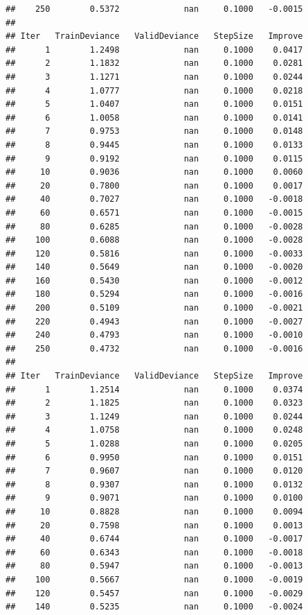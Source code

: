 \documentclass[]{book}
\begin{document}
\begin{verbatim}
##    250        0.5372             nan     0.1000   -0.0015
## 
## Iter   TrainDeviance   ValidDeviance   StepSize   Improve
##      1        1.2498             nan     0.1000    0.0417
##      2        1.1832             nan     0.1000    0.0281
##      3        1.1271             nan     0.1000    0.0244
##      4        1.0777             nan     0.1000    0.0218
##      5        1.0407             nan     0.1000    0.0151
##      6        1.0058             nan     0.1000    0.0141
##      7        0.9753             nan     0.1000    0.0148
##      8        0.9445             nan     0.1000    0.0133
##      9        0.9192             nan     0.1000    0.0115
##     10        0.9036             nan     0.1000    0.0060
##     20        0.7800             nan     0.1000    0.0017
##     40        0.7027             nan     0.1000   -0.0018
##     60        0.6571             nan     0.1000   -0.0015
##     80        0.6285             nan     0.1000   -0.0028
##    100        0.6088             nan     0.1000   -0.0028
##    120        0.5816             nan     0.1000   -0.0033
##    140        0.5649             nan     0.1000   -0.0020
##    160        0.5430             nan     0.1000   -0.0012
##    180        0.5294             nan     0.1000   -0.0016
##    200        0.5109             nan     0.1000   -0.0021
##    220        0.4943             nan     0.1000   -0.0027
##    240        0.4793             nan     0.1000   -0.0010
##    250        0.4732             nan     0.1000   -0.0016
## 
## Iter   TrainDeviance   ValidDeviance   StepSize   Improve
##      1        1.2514             nan     0.1000    0.0374
##      2        1.1825             nan     0.1000    0.0323
##      3        1.1249             nan     0.1000    0.0244
##      4        1.0758             nan     0.1000    0.0248
##      5        1.0288             nan     0.1000    0.0205
##      6        0.9950             nan     0.1000    0.0151
##      7        0.9607             nan     0.1000    0.0120
##      8        0.9307             nan     0.1000    0.0132
##      9        0.9071             nan     0.1000    0.0100
##     10        0.8828             nan     0.1000    0.0094
##     20        0.7598             nan     0.1000    0.0013
##     40        0.6744             nan     0.1000   -0.0017
##     60        0.6343             nan     0.1000   -0.0018
##     80        0.5947             nan     0.1000   -0.0013
##    100        0.5667             nan     0.1000   -0.0019
##    120        0.5457             nan     0.1000   -0.0029
##    140        0.5235             nan     0.1000   -0.0024

\end{verbatim}
\end{document}
